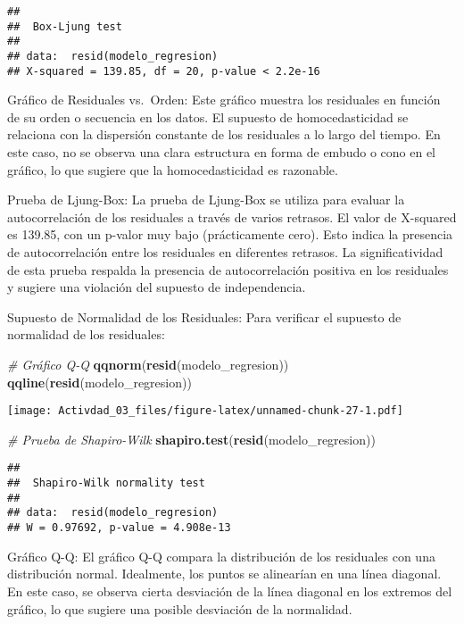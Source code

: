 \documentclass[
]{article}
\newenvironment{Shaded}{\begin{snugshade}}{\end{snugshade}}
\newcommand{\CommentTok}[1]{\textcolor[rgb]{0.56,0.35,0.01}{\textit{#1}}}
\newcommand{\FunctionTok}[1]{\textcolor[rgb]{0.13,0.29,0.53}{\textbf{#1}}}
\newcommand{\NormalTok}[1]{#1}
\begin{document}
\begin{verbatim}
## 
##  Box-Ljung test
## 
## data:  resid(modelo_regresion)
## X-squared = 139.85, df = 20, p-value < 2.2e-16
\end{verbatim}

Gráfico de Residuales vs.~Orden: Este gráfico muestra los residuales en
función de su orden o secuencia en los datos. El supuesto de
homocedasticidad se relaciona con la dispersión constante de los
residuales a lo largo del tiempo. En este caso, no se observa una clara
estructura en forma de embudo o cono en el gráfico, lo que sugiere que
la homocedasticidad es razonable.

Prueba de Ljung-Box: La prueba de Ljung-Box se utiliza para evaluar la
autocorrelación de los residuales a través de varios retrasos. El valor
de X-squared es 139.85, con un p-valor muy bajo (prácticamente cero).
Esto indica la presencia de autocorrelación entre los residuales en
diferentes retrasos. La significatividad de esta prueba respalda la
presencia de autocorrelación positiva en los residuales y sugiere una
violación del supuesto de independencia.

Supuesto de Normalidad de los Residuales: Para verificar el supuesto de
normalidad de los residuales:

\begin{Shaded}
\begin{Highlighting}[]
\CommentTok{\# Gráfico Q{-}Q}
\FunctionTok{qqnorm}\NormalTok{(}\FunctionTok{resid}\NormalTok{(modelo\_regresion))}
\FunctionTok{qqline}\NormalTok{(}\FunctionTok{resid}\NormalTok{(modelo\_regresion))}
\end{Highlighting}
\end{Shaded}

\texttt{[image: Activdad\_03\_files/figure-latex/unnamed-chunk-27-1.pdf]}

\begin{Shaded}
\begin{Highlighting}[]
\CommentTok{\# Prueba de Shapiro{-}Wilk}
\FunctionTok{shapiro.test}\NormalTok{(}\FunctionTok{resid}\NormalTok{(modelo\_regresion))}
\end{Highlighting}
\end{Shaded}

\begin{verbatim}
## 
##  Shapiro-Wilk normality test
## 
## data:  resid(modelo_regresion)
## W = 0.97692, p-value = 4.908e-13
\end{verbatim}

Gráfico Q-Q: El gráfico Q-Q compara la distribución de los residuales
con una distribución normal. Idealmente, los puntos se alinearían en una
línea diagonal. En este caso, se observa cierta desviación de la línea
diagonal en los extremos del gráfico, lo que sugiere una posible
desviación de la normalidad.
\end{document}
